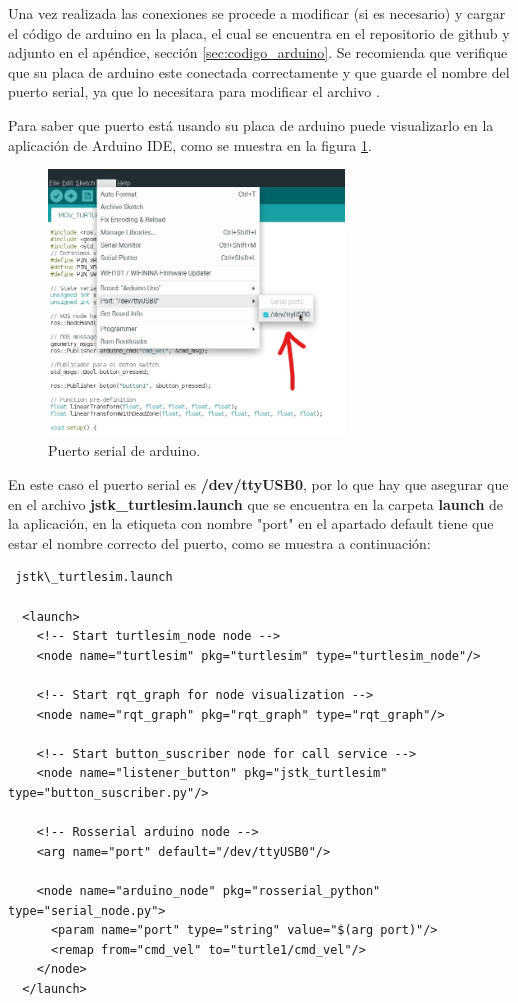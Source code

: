 \documentclass{article}
\begin{document}
Una vez realizada las conexiones se procede a modificar (si es necesario) y cargar el código de arduino en la placa, el cual se encuentra en el repositorio de github y adjunto en el apéndice, sección \ref{sec:codigo_arduino}. Se recomienda que verifique que su placa de arduino este conectada correctamente y que guarde el nombre del puerto serial, ya que lo necesitara para modificar el archivo .

Para saber que puerto está usando su placa de arduino puede visualizarlo en la aplicación de Arduino IDE, como se muestra en la figura \ref{fig:puerto}.

\begin{figure}[H]
  \centering
  \includegraphics[width=0.7\textwidth]{images/usbarduino.jpg}
  \caption{Puerto serial de arduino.}
  \label{fig:puerto}
\end{figure}

En este caso el puerto serial es \textbf{/dev/ttyUSB0}, por lo que hay que asegurar que en el archivo \textbf{jstk\_turtlesim.launch} que se encuentra en la carpeta \textbf{launch} de la aplicación, en la etiqueta con nombre "port" en el apartado default tiene que estar el nombre correcto del puerto, como se muestra a continuación:

\begin{verbatim} jstk\_turtlesim.launch

  <launch>
    <!-- Start turtlesim_node node -->
    <node name="turtlesim" pkg="turtlesim" type="turtlesim_node"/>
  
    <!-- Start rqt_graph for node visualization -->
    <node name="rqt_graph" pkg="rqt_graph" type="rqt_graph"/>
  
    <!-- Start button_suscriber node for call service -->
    <node name="listener_button" pkg="jstk_turtlesim" type="button_suscriber.py"/>
  
    <!-- Rosserial arduino node -->
    <arg name="port" default="/dev/ttyUSB0"/>
  
    <node name="arduino_node" pkg="rosserial_python" type="serial_node.py">
      <param name="port" type="string" value="$(arg port)"/>
      <remap from="cmd_vel" to="turtle1/cmd_vel"/>
    </node>
  </launch>
\end{verbatim}
\end{document}
